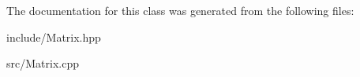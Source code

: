 The documentation for this class was generated from the following files\+:\begin{DoxyCompactItemize}
\item 
include/Matrix.\+hpp\item 
src/Matrix.\+cpp\end{DoxyCompactItemize}
